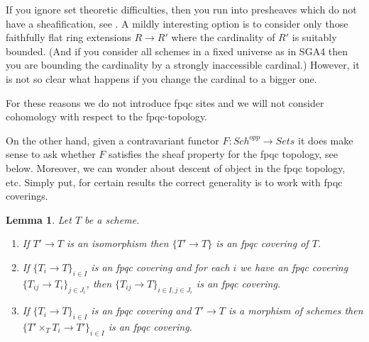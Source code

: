 \documentclass{stacks-project}
\theoremstyle{plain}
\newtheorem{lemma}[subsection]{Lemma}
\theoremstyle{definition}
\theoremstyle{remark}
\numberwithin{equation}{subsection}
\def\Sch{\mathit{Sch}}
\begin{document}
\medskip\noindent
If you ignore set theoretic difficulties, then you run into presheaves
which do not have a sheafification, see
\cite[Theorem 5.5]{Waterhouse-fpqc-sheafification}.
A mildly interesting option is to consider only those faithfully flat ring
extensions $R \to R'$ where the cardinality of $R'$ is suitably bounded.
(And if you consider all schemes in a fixed universe as in SGA4 then you
are bounding the cardinality by a strongly inaccessible cardinal.)
However, it is not so clear what happens if you change the cardinal
to a bigger one.

\medskip\noindent
For these reasons we do not introduce fpqc sites and we will not consider
cohomology with respect to the fpqc-topology.

\medskip\noindent
On the other hand, given a contravariant functor
$F : \Sch^{opp} \to \textit{Sets}$
it does make sense to ask whether $F$ satisfies the sheaf property
for the fpqc topology, see below.
Moreover, we can wonder about descent of object
in the fpqc topology, etc. Simply put, for certain results the correct
generality is to work with fpqc coverings.

\begin{lemma}
\label{lemma-fpqc}
Let $T$ be a scheme.
\begin{enumerate}
\item If $T' \to T$ is an isomorphism then $\{T' \to T\}$
is an fpqc covering of $T$.
\item If $\{T_i \to T\}_{i\in I}$ is an fpqc covering and for each
$i$ we have an fpqc covering $\{T_{ij} \to T_i\}_{j\in J_i}$, then
$\{T_{ij} \to T\}_{i \in I, j\in J_i}$ is an fpqc covering.
\item If $\{T_i \to T\}_{i\in I}$ is an fpqc covering
and $T' \to T$ is a morphism of schemes then
$\{T' \times_T T_i \to T'\}_{i\in I}$ is an fpqc covering.
\end{enumerate}
\end{lemma}
\end{document}
